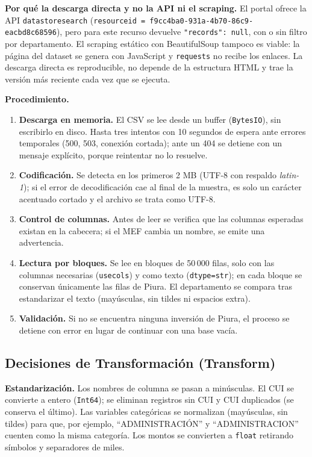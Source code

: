 \documentclass[12pt,a4paper]{article}
\newcommand{\var}[1]{{\renewcommand{\_}{\textunderscore\allowbreak}\texttt{#1}}}
\begin{document}
\textbf{Por qué la descarga directa y no la API ni el scraping.} El portal ofrece la API
\var{datastore\_search} (\var{resource\_id = f9cc4ba0-931a-4b70-86c9-eacbd8c68596}), pero
para este recurso devuelve \var{"records": null}, con o sin filtro por departamento. El
scraping estático con BeautifulSoup tampoco es viable: la página del dataset se genera con
JavaScript y \var{requests} no recibe los enlaces. La descarga directa es reproducible, no
depende de la estructura HTML y trae la versión más reciente cada vez que se ejecuta.

\textbf{Procedimiento.}
\begin{enumerate}
  \item \textbf{Descarga en memoria.} El CSV se lee desde un buffer (\var{BytesIO}), sin
        escribirlo en disco. Hasta tres intentos con 10 segundos de espera ante errores
        temporales (500, 503, conexión cortada); ante un 404 se detiene con un mensaje
        explícito, porque reintentar no lo resuelve.
  \item \textbf{Codificación.} Se detecta en los primeros 2 MB (UTF-8 con respaldo
        \emph{latin-1}); si el error de decodificación cae al final de la muestra, es solo
        un carácter acentuado cortado y el archivo se trata como UTF-8.
  \item \textbf{Control de columnas.} Antes de leer se verifica que las columnas
        esperadas existan en la cabecera; si el MEF cambia un nombre, se emite una
        advertencia.
  \item \textbf{Lectura por bloques.} Se lee en bloques de 50\,000 filas, solo con las
        columnas necesarias (\var{usecols}) y como texto (\var{dtype=str}); en cada bloque
        se conservan únicamente las filas de Piura. El departamento se compara tras
        estandarizar el texto (mayúsculas, sin tildes ni espacios extra).
  \item \textbf{Validación.} Si no se encuentra ninguna inversión de Piura, el proceso se
        detiene con error en lugar de continuar con una base vacía.
\end{enumerate}

\subsection{Decisiones de Transformación (Transform)}

\textbf{Estandarización.} Los nombres de columna se pasan a minúsculas. El CUI se convierte
a entero (\var{Int64}); se eliminan registros sin CUI y CUI duplicados (se conserva el
último). Las variables categóricas se normalizan (mayúsculas, sin tildes) para que, por
ejemplo, ``ADMINISTRACIÓN'' y ``ADMINISTRACION'' cuenten como la misma categoría. Los montos
se convierten a \var{float} retirando símbolos y separadores de miles.
\end{document}
